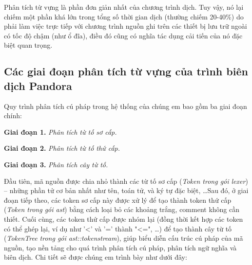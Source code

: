 Phân tích từ vựng là phần đơn giản nhất của chương trình dịch. Tuy vậy, nó lại chiếm một phần khá lớn trong tổng số thời gian dịch (thường chiếm 20-40\%) do phải làm việc trực tiếp với chương trình nguồn ghi trên các thiết bị lưu trữ ngoài có tốc độ chậm (như ổ đĩa), điều đó cũng có nghĩa tác dụng cải tiến của nó đặc biệt quan trọng.

\subsection{Các giai đoạn phân tích từ vựng của trình biên dịch Pandora}
Quy trình phân tích cú pháp trong hệ thống của chúng em bao gồm ba giai đoạn chính:

\textbf{Giai đoạn 1.} \textit{Phân tích từ tố sơ cấp.}

\textbf{Giai đoạn 2.} \textit{Phân tích từ tố thứ cấp.}

\textbf{Giai đoạn 3.} \textit{Phân tích cây từ tố.}

Đầu tiên, mã nguồn được chia nhỏ thành các từ tố sơ cấp (\textit{Token trong gói lexer}) – những phần tử cơ bản nhất như tên, toán tử, và ký tự đặc biệt, \dots Sau đó, ở giai đoạn tiếp theo, các token sơ cấp này được xử lý để tạo thành token thứ cấp (\textit{Token trong gói ast}) bằng cách loại bỏ các khoảng trắng, comment không cần thiết. Cuối cùng, các token thứ cấp được nhóm lại (đồng thời kết hợp các token có thể ghép lại, ví dụ như '<' và '=' thành "<=", \dots) để tạo thành cây từ tố (\textit{TokenTree trong gói ast::tokenstream}), giúp biểu diễn cấu trúc cú pháp của mã nguồn, tạo nền tảng cho quá trình phân tích cú pháp, phân tích ngữ nghĩa và biên dịch. Chi tiết sẽ được chúng em trình bày như dưới đây:

